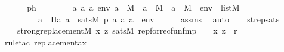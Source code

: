 \begin{isabellebody}
%
\isadelimproof
%
\endisadelimproof
%
\isatagproof
{}\isamarkupfalse%
\ {\isacharminus}{\kern0pt}\ \isanewline
\isanewline
\ \ \isamarkupfalse%
\ ph\ {\isacharcolon}{\kern0pt}\ \isanewline
\ \ \ \ \ \ {\isachardoublequoteopen}{\isacharparenleft}{\kern0pt}{\isasymAnd}a{}\ a{}\ a{}\ env{\isachardot}{\kern0pt}\ a{}\ {\isasymin}\ M\ {\isasymLongrightarrow}\ a{}\ {\isasymin}\ M\ {\isasymLongrightarrow}\ a{}\ {\isasymin}\ M\ {\isasymLongrightarrow}\ env\ {\isasymin}\ list{\isacharparenleft}{\kern0pt}M{\isacharparenright}{\kern0pt}\ \isanewline
\ \ \ \ \ \ \ \ {\isasymLongrightarrow}\ a{}\ {\isacharequal}{\kern0pt}\ H{\isacharparenleft}{\kern0pt}a{}{\isacharcomma}{\kern0pt}\ a{}{\isacharparenright}{\kern0pt}\ {\isasymlongleftrightarrow}\ sats{\isacharparenleft}{\kern0pt}M{\isacharcomma}{\kern0pt}\ p{\isacharcomma}{\kern0pt}\ {\isacharbrackleft}{\kern0pt}a{}{\isacharcomma}{\kern0pt}\ a{}{\isacharcomma}{\kern0pt}\ a{}{\isacharbrackright}{\kern0pt}\ {\isacharat}{\kern0pt}\ env{\isacharparenright}{\kern0pt}{\isacharparenright}{\kern0pt}{\isachardoublequoteclose}\isanewline
\ \ \ \ \isamarkupfalse%
\ assms\ \isamarkupfalse%
\ auto\isanewline
\isanewline
\ \ \isamarkupfalse%
\ strep{\isacharunderscore}{\kern0pt}sats\ {\isacharcolon}{\kern0pt}\ \isanewline
\ \ \ \ {\isachardoublequoteopen}strong{\isacharunderscore}{\kern0pt}replacement{\isacharparenleft}{\kern0pt}{\isacharhash}{\kern0pt}{\isacharhash}{\kern0pt}M{\isacharcomma}{\kern0pt}\ {\isasymlambda}x{\isachardot}{\kern0pt}\ {\isasymlambda}z{\isachardot}{\kern0pt}\ sats{\isacharparenleft}{\kern0pt}M{\isacharcomma}{\kern0pt}\ rep{\isacharunderscore}{\kern0pt}for{\isacharunderscore}{\kern0pt}recfun{\isacharunderscore}{\kern0pt}fm{\isacharparenleft}{\kern0pt}p{\isacharcomma}{\kern0pt}\ {}{\isacharcomma}{\kern0pt}\ {}{\isacharcomma}{\kern0pt}\ {}{\isacharparenright}{\kern0pt}{\isacharcomma}{\kern0pt}\ {\isacharbrackleft}{\kern0pt}x{\isacharcomma}{\kern0pt}\ z{\isacharbrackright}{\kern0pt}\ {\isacharat}{\kern0pt}\ {\isacharbrackleft}{\kern0pt}r{\isacharbrackright}{\kern0pt}{\isacharparenright}{\kern0pt}{\isacharparenright}{\kern0pt}{\isachardoublequoteclose}\isanewline
\ \ \ \ \isamarkupfalse%
\ {\isacharparenleft}{\kern0pt}rule{\isacharunderscore}{\kern0pt}tac\ replacement{\isacharunderscore}{\kern0pt}ax{\isacharparenright}{\kern0pt}\ \isanewline

\end{isabellebody}
